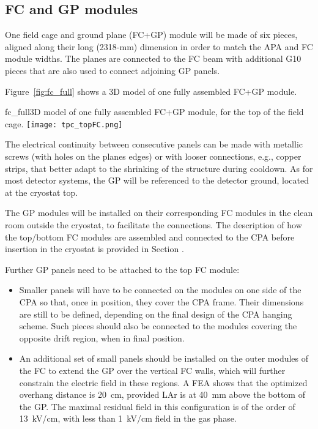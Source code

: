 \subsection{FC and GP modules}

One field cage and ground plane (FC+GP) module will be made of six pieces, aligned 
along their long (2318-mm) dimension 
 in order to match the APA and FC module widths. The planes are connected to the FC beam with additional 
G10 pieces that are also used to connect adjoining 
GP panels. 

Figure~\ref{fig:fc_full} shows a 3D model of one fully assembled FC+GP module.

\begin{cdrfigure}{fc_full}{3D model of one fully assembled FC+GP module, for the top of the field cage. }
\texttt{[image: tpc\_topFC.png]}
\end{cdrfigure}

The electrical continuity between consecutive panels can be made 
with metallic screws (with holes on the planes edges) or with looser connections, e.g., copper strips, that better adapt to the shrinking of the structure during cooldown. 
As for most detector systems, the GP will %
be referenced to the detector ground, located 
at the cryostat top.

The GP modules  will be installed on their corresponding FC modules in the clean room outside the cryostat, to facilitate the connections. The description of how the top/bottom FC modules are assembled and connected to the CPA before insertion in the cryostat is provided in Section  .

Further GP panels need to be attached to the top FC module:
\begin{itemize}
\item Smaller panels will have to be connected on the modules on one side of the CPA so that, once in position, they 
cover the CPA frame. Their dimensions are 
still to be defined, depending on the final design of the CPA hanging scheme. Such  pieces should also be connected to the modules covering the opposite drift region, when in final position.
\item An additional 
set of small panels should be installed on the outer modules of the FC to extend the GP over the vertical FC walls, which will  
further constrain the electric field in these regions. A FEA 
shows that the optimized overhang distance is 20~cm, provided LAr is at 40~mm above the bottom of the GP. The maximal residual field in this configuration is of the order of 13~kV/cm, with less than 1~kV/cm field in the gas phase.
\end{itemize}

